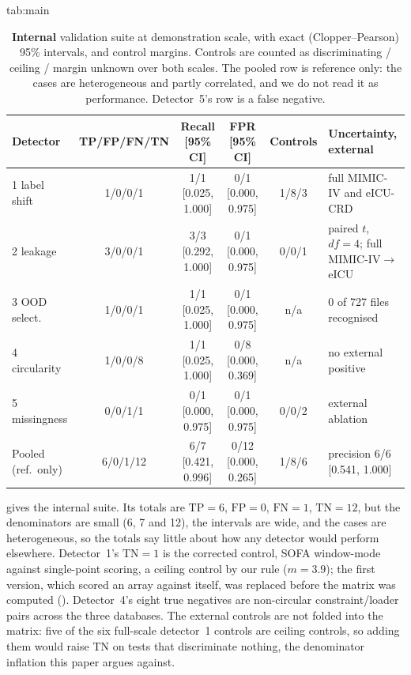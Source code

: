 \documentclass[pmlr,twocolumn,10pt]{jmlr}
\begin{document}
\begin{table}[t]
\floatconts
  {tab:main}
  {\caption{\textbf{Internal} validation suite at demonstration scale, with exact
   (Clopper--Pearson) 95\% intervals, and control margins. Controls are counted
   as discriminating / ceiling / margin unknown over both scales. The pooled row
   is reference only: the cases are heterogeneous and partly correlated, and we
   do not read it as performance. Detector~5's row is a false negative.}}
  {\footnotesize\setlength{\tabcolsep}{3pt}%
  \begin{tabular}{@{}lccccp{3.3cm}@{}}
  \toprule
  \bfseries Detector & \bfseries TP/FP/FN/TN & \bfseries Recall [95\% CI] &
    \bfseries FPR [95\% CI] & \bfseries Controls & \bfseries Uncertainty, external\\
  \midrule
  1 label shift & 1/0/0/1 & 1/1 [0.025, 1.000] & 0/1 [0.000, 0.975] & 1/8/3 & full MIMIC-IV and eICU-CRD\\
  2 leakage     & 3/0/0/1 & 3/3 [0.292, 1.000] & 0/1 [0.000, 0.975] & 0/0/1 & paired $t$, $df=4$; full MIMIC-IV$\to$eICU\\
  3 OOD select. & 1/0/0/1 & 1/1 [0.025, 1.000] & 0/1 [0.000, 0.975] & n/a & 0 of 727 files recognised\\
  4 circularity & 1/0/0/8 & 1/1 [0.025, 1.000] & 0/8 [0.000, 0.369] & n/a & no external positive\\
  5 missingness & 0/0/1/1 & 0/1 [0.000, 0.975] & 0/1 [0.000, 0.975] & 0/0/2 & external ablation\\
  \midrule
  Pooled (ref.\ only) & 6/0/1/12 & 6/7 [0.421, 0.996] & 0/12 [0.000, 0.265] & 1/8/6 & precision 6/6 [0.541, 1.000]\\
  \bottomrule
  \end{tabular}}
\end{table}

 gives the internal suite. Its totals are $\mathrm{TP}=6$,
$\mathrm{FP}=0$, $\mathrm{FN}=1$, $\mathrm{TN}=12$, but the denominators are
small (6, 7 and 12), the intervals are wide, and the cases are heterogeneous, so
the totals say little about how any detector would perform elsewhere. Detector~1's
$\mathrm{TN}=1$ is the corrected control, SOFA window-mode against single-point
scoring, a ceiling control by our rule ($m=3.9$); the first version, which scored
an array against itself, was replaced before the matrix was computed
(). Detector~4's eight true negatives are non-circular
constraint/loader pairs across the three databases. The external controls are
not folded into the matrix: five of the six full-scale detector~1 controls are
ceiling controls, so adding them would raise TN on tests that discriminate
nothing, the denominator inflation this paper argues against.
\end{document}
